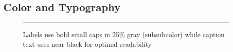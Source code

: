 \documentclass[11pt,a4paper]{article}
\begin{document}
\subsection{Color and Typography}

\begin{figure}[tbp]
  \centering
  \rule{0.6\textwidth}{0.3\textwidth}
  \caption{Labels use bold small caps in 25\% gray (subsubcolor) while caption text uses near-black for optimal readability}
\end{figure}
\end{document}
